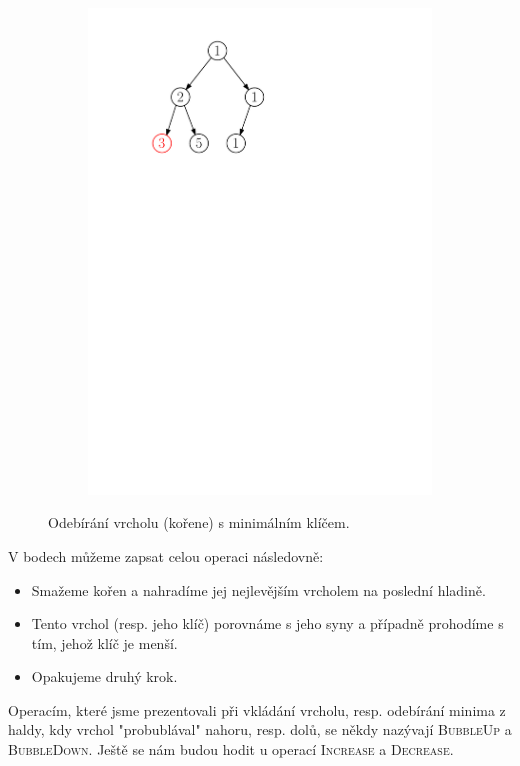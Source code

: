 \begin{figure}[h]
\begin{subfigure}{5cm}
        \includegraphics[scale=.5]{01-grafalgo/images/ch01_odebirani_5}
    \end{subfigure}
    \caption{Odebírání vrcholu (kořene) s minimálním klíčem.}
    \label{fig:odebirani_vrcholu_halda}
\end{figure}
V bodech můžeme zapsat celou operaci následovně:
\begin{itemize}
    \item Smažeme kořen a nahradíme jej nejlevějším vrcholem na poslední hladině.
    \item Tento vrchol (resp. jeho klíč) porovnáme s jeho syny a případně prohodíme s tím, jehož klíč je menší.
    \item Opakujeme druhý krok.
\end{itemize}
Operacím, které jsme prezentovali při vkládání vrcholu, resp. odebírání minima z haldy, kdy vrchol "probublával" nahoru, resp. dolů, se někdy nazývají \textsc{BubbleUp} a \textsc{BubbleDown}. Ještě se nám budou hodit u operací \textsc{Increase} a \textsc{Decrease}.

